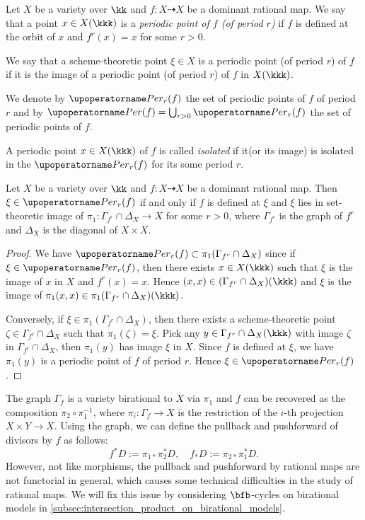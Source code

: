 \begin{definition}
	Let $X$ be a variety over $\kk$ and $f: X \dashrightarrow X$ be a dominant rational map.
	We say that a point $x \in X(\kkk)$ is a \emph{periodic point of $f$ (of period $r$)} if $f$ is defined at the orbit of $x$ and $f^r(x) = x$ for some $r > 0$.

	We say that a scheme-theoretic point $\xi \in X$ is a periodic point (of period $r$) of $f$ if it is the image of a periodic point (of period $r$) of $f$ in $X(\kkk)$.

	We denote by $\Per_r(f)$ the set of periodic points of $f$ of period $r$ and by $\Per(f) = \bigcup_{r > 0} \Per_r(f)$ the set of periodic points of $f$.

	A periodic point $x \in X(\kkk)$ of $f$ is called \emph{isolated} if it(or its image) is isolated in the $\Per_r(f)$ for its some period $r$.
\end{definition}

\begin{proposition}
	Let $X$ be a variety over $\kk$ and $f: X \dashrightarrow X$ be a dominant rational map.
	Then $\xi \in \Per_r(f)$ if and only if $f$ is defined at $\xi$ and $\xi$ lies in set-theoretic image of $\pi_1: \Gamma_{f^r} \cap \Delta_X \to X$ for some $r > 0$, where $\Gamma_{f^r}$ is the graph of $f^r$ and $\Delta_X$ is the diagonal of $X \times X$.
\end{proposition}
\begin{proof}
	We have $\Per_r(f) \subset \pi_1(\Gamma_{f^r} \cap \Delta_X)$ since if $\xi \in \Per_r(f)$, then there exists $x \in X(\kkk)$ such that $\xi$ is the image of $x$ in $X$ and $f^r(x) = x$.
	Hence $(x,x) \in (\Gamma_{f^r} \cap \Delta_X)(\kkk)$ and $\xi$ is the image of $\pi_1(x,x) \in \pi_1(\Gamma_{f^r} \cap \Delta_X)(\kkk)$.

	Conversely, if $\xi \in \pi_1(\Gamma_{f^r} \cap \Delta_X)$, then there exists a scheme-theoretic point $\zeta \in \Gamma_{f^r} \cap \Delta_X$ such that $\pi_1(\zeta) = \xi$.
	Pick any $y \in \Gamma_{f^r} \cap \Delta_X(\kkk)$ with image $\zeta$ in $\Gamma_{f^r} \cap \Delta_X$, then $\pi_1(y)$ has image $\xi$ in $X$.
	Since $f$ is defined at $\xi$, we have $\pi_1(y)$ is a periodic point of $f$ of period $r$.
	Hence $\xi \in \Per_r(f)$.
\end{proof}

The graph $\Gamma_f$ is a variety birational to $X$ via $\pi_1$ and $f$ can be recovered as the composition $\pi_2 \circ \pi_1^{-1}$, where $\pi_i: \Gamma_f \to X$ is the restriction of the $i$-th projection $X \times Y \to X$.
Using the graph, we can define the pullback and pushforward of divisors by $f$ as follows:
\[ f^*D := \pi_{1*} \pi_2^* D, \quad f_*D := \pi_{2*} \pi_1^* D. \]
However, not like morphisms, the pullback and pushforward by rational maps are not functorial in general, which causes some technical difficulties in the study of rational maps.
We will fix this issue by considering $\bfb$-cycles on birational models in \cref{subsec:intersection_product_on_birational_models}.


